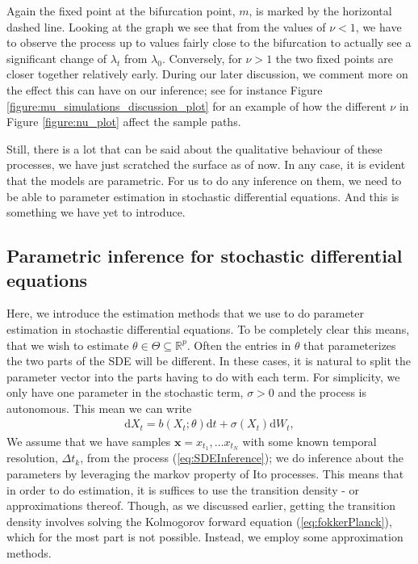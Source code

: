 Again the fixed point at the bifurcation point, $m$, is marked by the horizontal dashed line. Looking at the graph we see that from the values of $\nu < 1$, we have to observe the process up to values fairly close to the bifurcation to actually see a significant change of $\lambda_t$ from $\lambda_0$. Conversely, for $\nu>1$ the two fixed points are closer together relatively early. During our later discussion, we comment more on the effect this can have on our inference; see for instance Figure \ref{figure:mu_simulations_discussion_plot} for an example of how the different $\nu$ in Figure \ref{figure:nu_plot} affect the sample paths. 

Still, there is a lot that can be said about the qualitative behaviour of these processes, we have just scratched the surface as of now. In any case, it is evident that the models are parametric. For us to do any inference on them, we need to be able to parameter estimation in stochastic differential equations. And this is something we have yet to introduce.
\subsection{Parametric inference for stochastic differential equations}
Here, we introduce the estimation methods that we use to do parameter estimation in stochastic differential equations. To be completely clear this means, that we wish to estimate $\theta\in\Theta\subseteq\mathbb{R}^p$. Often the entries in $\theta$ that parameterizes the two parts of the SDE will be different. In these cases, it is natural to split the parameter vector into the parts having to do with each term. For simplicity, we only have one parameter in the stochastic term, $\sigma>0$ and the process is autonomous. This mean we can write
\begin{align}
    \mathrm{d}X_t = b(X_t; \theta)\mathrm{d}t + \sigma\left(X_t\right)\mathrm{d}W_t, \label{eq:SDEInference}
\end{align}
We assume that we have samples $\mathbf{x} = x_{t_1},\dots x_{t_N}$ with some known temporal resolution, $\Delta t_k$, from the process (\ref{eq:SDEInference}); we do inference about the parameters by leveraging the markov property of Ito processes. This means that in order to do estimation, it is suffices to use the transition density - or approximations thereof. Though, as we discussed earlier, getting the transition density involves solving the Kolmogorov forward equation (\ref{eq:fokkerPlanck}), which for the most part is not possible. Instead, we employ some approximation methods.

